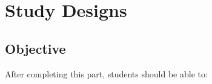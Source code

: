 \documentclass[11pt, chapterprefix=true]{scrbook}\usepackage[]{graphicx}\usepackage[]{color}
\begin{document}
\begin{exercises}
%
%
%
%
%
%
%
%

\end{exercises}
\onecolumn



\chapter{Study Designs}
\label{chap:ch5}

\section{Objective}

After completing this part, students should be able to:
\end{document}
